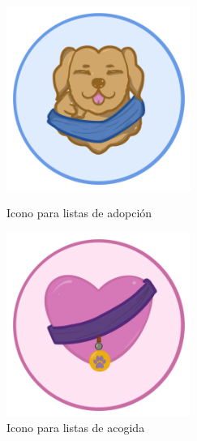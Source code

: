 \documentclass[a4paper, 12pt]{article}
\begin{document}
\begin{figure}[H]
   	\begin{minipage}{0.48\textwidth}
		\begin{center}
			{\includegraphics[width=6cm]{logo/Adoptar.png}\par}
			\caption{Icono para listas de adopción}
		\end{center}  
	\end{minipage}\hfill
   	\begin{minipage}{0.48\textwidth}
		\begin{center}
			{\includegraphics[width=6cm]{logo/Acoger.png}\par}
			\caption{Icono para listas de acogida}
		\end{center}  
	\end{minipage}\hfill
\end{figure}
\end{document}
